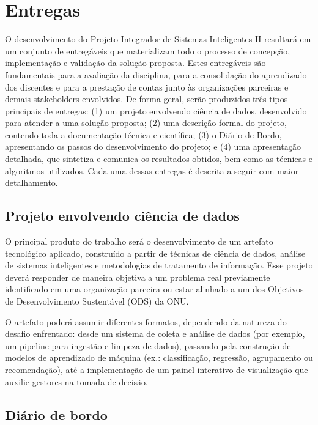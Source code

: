 \chapter{Entregas}

O desenvolvimento do Projeto Integrador de Sistemas Inteligentes II resultará em um conjunto de entregáveis que materializam todo o processo de concepção, implementação e validação da solução proposta. Estes entregáveis são fundamentais para a avaliação da disciplina, para a consolidação do aprendizado dos discentes e para a prestação de contas junto às organizações parceiras e demais stakeholders envolvidos. De forma geral, serão produzidos três tipos principais de entregas: (1) um projeto envolvendo ciência de dados, desenvolvido para atender a uma solução proposta; (2) uma descrição formal do projeto, contendo toda a documentação técnica e científica; (3) o Diário de Bordo, apresentando os passos do desenvolvimento do projeto; e (4) uma apresentação detalhada, que sintetiza e comunica os resultados obtidos, bem como as técnicas e algoritmos utilizados. Cada uma dessas entregas é descrita a seguir com maior detalhamento.

\section{Projeto envolvendo ciência de dados}

O principal produto do trabalho será o desenvolvimento de um artefato tecnológico aplicado, construído a partir de técnicas de ciência de dados, análise de sistemas inteligentes e metodologias de tratamento de informação. Esse projeto deverá responder de maneira objetiva a um problema real previamente identificado em uma organização parceira ou estar alinhado a um dos Objetivos de Desenvolvimento Sustentável (ODS) da ONU.

O artefato poderá assumir diferentes formatos, dependendo da natureza do desafio enfrentado: desde um sistema de coleta e análise de dados (por exemplo, um pipeline para ingestão e limpeza de dados), passando pela construção de modelos de aprendizado de máquina (ex.: classificação, regressão, agrupamento ou recomendação), até a implementação de um painel interativo de visualização que auxilie gestores na tomada de decisão.

\section{Diário de bordo}

